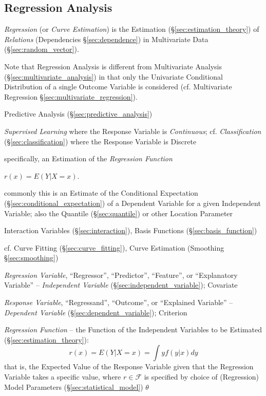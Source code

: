 \subsection{Regression Analysis}\label{sec:regression_analysis}

\emph{Regression} (or \emph{Curve Estimation}) is the Estimation
(\S\ref{sec:estimation_theory}) of \emph{Relations} (Dependencies
\S\ref{sec:dependence}) in Multivariate Data (\S\ref{sec:random_vector}).

Note that Regression Analysis is different from Multivariate Analysis
(\S\ref{sec:multivariate_analysis}) in that only the Univariate Conditional
Distribution of a single Outcome Variable is considered (cf. Multivariate
Regression \S\ref{sec:multivariate_regression}).

\fist Predictive Analysis (\S\ref{sec:predictive_analysis})

\emph{Supervised Learning} where the Response Variable is \emph{Continuous}; cf.
\emph{Classification} (\S\ref{sec:classification}) where the Response Variable
is Discrete

specifically, an Estimation of the \emph{Regression Function}

$r(x) = E(Y | X = x)$.

commonly this is an Estimate of the Conditional Expectation
(\S\ref{sec:conditional_expectation}) of a Dependent Variable for a given
Independent Variable; also the Quantile (\S\ref{sec:quantile}) or other Location
Parameter

Interaction Variables (\S\ref{sec:interaction}), Basis Functions
(\S\ref{sec:basis_function})

\fist cf. Curve Fitting (\S\ref{sec:curve_fitting}), Curve Estimation (Smoothing
\S\ref{sec:smoothing})

\emph{Regression Variable}, ``Regressor'', ``Predictor'', ``Feature'', or
``Explanatory Variable'' -- \emph{Independent Variable}
(\S\ref{sec:independent_variable}); Covariate

\emph{Response Variable}, ``Regressand'', ``Outcome'', or ``Explained Variable''
-- \emph{Dependent Variable} (\S\ref{sec:dependent_variable}); Criterion

\emph{Regression Function} -- the Function of the Independent Variables to be
Estimated (\S\ref{sec:estimation_theory}):
\[
  r(x) = E(Y | X = x) = \int y f(y|x) dy
\]
that is, the Expected Value of the Response Variable given that the Regression
Variable takes a specific value, where $r \in \mathcal{F}$ is specified by
choice of (Regression) Model Parameters (\S\ref{sec:statistical_model}) $\theta$


